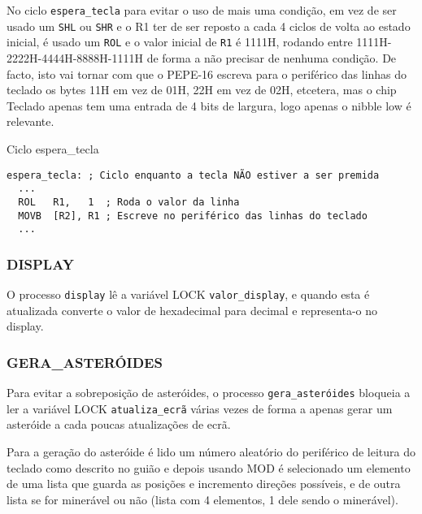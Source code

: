 \documentclass{article}
\begin{document}
\bigbreak

No ciclo \texttt{espera\_tecla} para evitar o uso de mais uma condição, em vez de ser usado um \texttt{SHL} ou \texttt{SHR} e o R1 ter de ser reposto a cada 4 ciclos de volta ao estado inicial, é usado um \texttt{ROL} e o valor inicial de \texttt{R1} é 1111H, rodando entre 1111H-2222H-4444H-8888H-1111H de forma a não precisar de nenhuma condição. De facto, isto vai tornar com que o PEPE-16 escreva para o periférico das linhas do teclado os bytes 11H em vez de 01H, 22H em vez de 02H, etcetera, mas o chip Teclado apenas tem uma entrada de 4 bits de largura, logo apenas o nibble low é relevante.

\bigbreak

\begin{code}{Ciclo espera\_tecla}{}
    \begin{verbatim}
espera_tecla: ; Ciclo enquanto a tecla NÃO estiver a ser premida
  ...
  ROL   R1,   1  ; Roda o valor da linha
  MOVB  [R2], R1 ; Escreve no periférico das linhas do teclado
  ...
    \end{verbatim}
\end{code}

\bigbreak

\subsubsection{DISPLAY}
O processo \texttt{display} lê a variável LOCK \texttt{valor\_display}, e quando esta é atualizada converte o valor de hexadecimal para decimal e representa-o no display.

\bigbreak

\subsubsection{GERA\_ASTERÓIDES}
Para evitar a sobreposição de asteróides, o processo \texttt{gera\_asteróides} bloqueia a ler a variável LOCK \texttt{atualiza\_ecrã} várias vezes de forma a apenas gerar um asteróide a cada poucas atualizações de ecrã.

\bigbreak

Para a geração do asteróide é lido um número aleatório do periférico de leitura do teclado como descrito no guião e depois  usando MOD é selecionado um elemento de uma lista que guarda as posições e incremento direções possíveis, e de outra lista se for minerável ou não (lista com 4 elementos, 1 dele sendo o minerável).

\newpage
\end{document}

